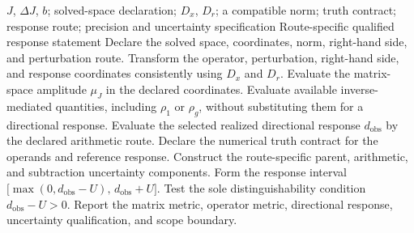 \begin{algorithm}[htbp]
\caption{Scale-explicit uncertainty-qualified assessment of a tangent-only matrix perturbation.}
\label{alg:assessment}
\begin{algorithmic}[1]
\Require $J$, $\Delta J$, $b$; solved-space declaration; $D_x$, $D_r$; a compatible norm; truth contract; response route; precision and uncertainty specification
\Ensure Route-specific qualified response statement
\State Declare the solved space, coordinates, norm, right-hand side, and perturbation route.
\State Transform the operator, perturbation, right-hand side, and response coordinates consistently using $D_x$ and $D_r$.
\State Evaluate the matrix-space amplitude $\mu_J$ in the declared coordinates.
\State Evaluate available inverse-mediated quantities, including $\rho_1$ or $\rho_g$, without substituting them for a directional response.
\State Evaluate the selected realized directional response $d_{\mathrm{obs}}$ by the declared arithmetic route.
\State Declare the numerical truth contract for the operands and reference response.
\State Construct the route-specific parent, arithmetic, and subtraction uncertainty components.
\State Form the response interval $\bigl[\max(0,d_{\mathrm{obs}}-U),\,d_{\mathrm{obs}}+U\bigr]$.
\State Test the sole distinguishability condition $d_{\mathrm{obs}}-U>0$.
\State Report the matrix metric, operator metric, directional response, uncertainty qualification, and scope boundary.
\end{algorithmic}
\end{algorithm}
